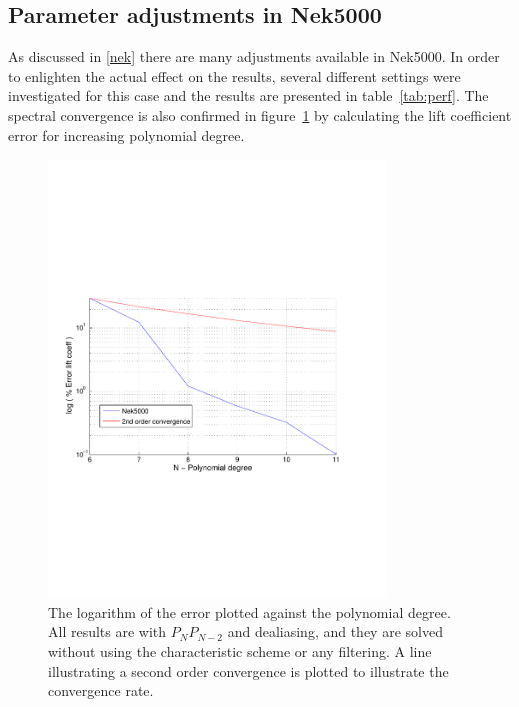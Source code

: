 \subsection{Parameter adjustments in Nek5000}
As discussed in \cref{nek} there are many adjustments available in Nek5000. 
In order to enlighten the actual effect on the results, several different settings were 
investigated for this case and the results are presented in table~\ref{tab:perf}. 
The spectral convergence is also confirmed in figure~\ref{fig:liftconv} by calculating the 
lift coefficient error for increasing polynomial degree. 
%
\begin{figure}[h]
	\centerline{
        \includegraphics[trim=0.5cm 7cm 0.5cm 7cm, width=0.8\textwidth]{Figures/lift_coef2.pdf}}
	\caption{The logarithm of the error plotted against the polynomial degree. All results 
        are with $P_NP_{N-2}$ and dealiasing, and they are solved without using the 
    characteristic scheme or any filtering. A line illustrating a second order convergence is 
    plotted to illustrate the convergence rate.}
	\label{fig:liftconv}
\end{figure}
%

